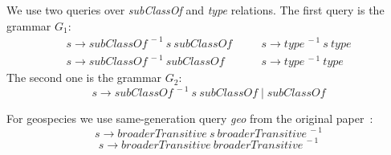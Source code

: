 We use two queries over \textit{subClassOf} and \textit{type} relations.
The first query is the grammar $G_1$:
\[
 \begin{array}{lcl}
   s  \rightarrow \textit{subClassOf}^{\ -1} \ s \ \textit{subClassOf}   & \quad & s  \rightarrow \textit{type}^{\ -1} \ s \ \textit{type}     \\
   s  \rightarrow \textit{subClassOf}^{\ -1} \ \textit{subClassOf}       & \quad & s  \rightarrow  \textit{type}^{\ -1}  \ \textit{type}

 \end{array}
 \]
The second one is the grammar $G_2$: \[s \rightarrow \textit{subClassOf}^{\ -1} \ s \ \textit{subClassOf} \mid  \textit{subClassOf}\]

For geospecies we use same-generation query \textit{geo} from the original paper~\cite{Kuijpers:2019:ESC:3335783.3335791}: \[s \rightarrow \textit{broaderTransitive} \ s \ \textit{broaderTransitive}^{\ -1} \]
\[s \rightarrow \textit{broaderTransitive}  \ \textit{broaderTransitive}^{\ -1} \]


